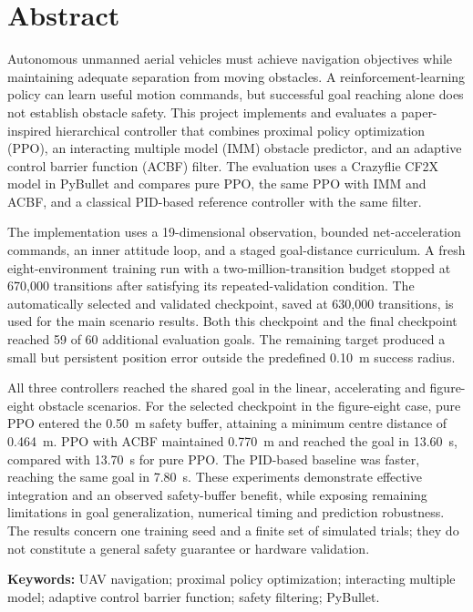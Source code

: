 \chapter*{Abstract}
Autonomous unmanned aerial vehicles must achieve navigation objectives while maintaining adequate separation from moving obstacles. A reinforcement-learning policy can learn useful motion commands, but successful goal reaching alone does not establish obstacle safety. This project implements and evaluates a paper-inspired hierarchical controller that combines proximal policy optimization (PPO), an interacting multiple model (IMM) obstacle predictor, and an adaptive control barrier function (ACBF) filter. The evaluation uses a Crazyflie CF2X model in PyBullet and compares pure PPO, the same PPO with IMM and ACBF, and a classical PID-based reference controller with the same filter.

The implementation uses a 19-dimensional observation, bounded net-acceleration commands, an inner attitude loop, and a staged goal-distance curriculum. A fresh eight-environment training run with a two-million-transition budget stopped at 670,000 transitions after satisfying its repeated-validation condition. The automatically selected and validated checkpoint, saved at 630,000 transitions, is used for the main scenario results. Both this checkpoint and the final checkpoint reached 59 of 60 additional evaluation goals. The remaining target produced a small but persistent position error outside the predefined 0.10~m success radius.

All three controllers reached the shared goal in the linear, accelerating and figure-eight obstacle scenarios. For the selected checkpoint in the figure-eight case, pure PPO entered the 0.50~m safety buffer, attaining a minimum centre distance of 0.464~m. PPO with ACBF maintained 0.770~m and reached the goal in 13.60~s, compared with 13.70~s for pure PPO. The PID-based baseline was faster, reaching the same goal in 7.80~s. These experiments demonstrate effective integration and an observed safety-buffer benefit, while exposing remaining limitations in goal generalization, numerical timing and prediction robustness. The results concern one training seed and a finite set of simulated trials; they do not constitute a general safety guarantee or hardware validation.

\noindent\textbf{Keywords:} UAV navigation; proximal policy optimization; interacting multiple model; adaptive control barrier function; safety filtering; PyBullet.
